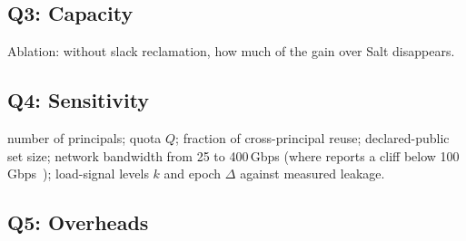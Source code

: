 \subsection{Q3: Capacity}
\label{sec:eval-capacity}
\begin{figure}[t]
\centering
{}
\caption{}
\label{fig:capacity}
\end{figure}
 Ablation: without slack reclamation, how
much of the gain over Salt disappears.

\subsection{Q4: Sensitivity}
\label{sec:eval-sensitivity}
 number of principals; quota $Q$; fraction of cross-principal
reuse; declared-public set size; network bandwidth from 25 to 400\,Gbps (where
\mc reports a cliff below 100\,Gbps~\cite{qin2025mooncake}); load-signal levels
$k$ and epoch $\Delta$ against measured leakage.

\subsection{Q5: Overheads}
\label{sec:eval-overhead}
